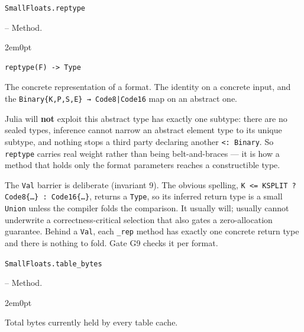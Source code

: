 \par\medskip\noindent\begin{minipage}{\linewidth}
\hypertarget{12298054483771101579}{\texttt{SmallFloats.reptype}}  -- {Method.}
\nopagebreak
\begin{adjustwidth}{2em}{0pt}


\begin{verbatim}
reptype(F) -> Type
\end{verbatim}

The concrete representation of a format. The identity on a concrete input, and the \texttt{Binary\{K,P,S,E\} → Code8|Code16} map on an abstract one.

Julia will \textbf{not} exploit {\textquotedbl}this abstract type has exactly one subtype{\textquotedbl}: there are no sealed types, inference cannot narrow an abstract element type to its unique subtype, and nothing stops a third party declaring another \texttt{<: Binary}. So \texttt{reptype} carries real weight rather than being belt-and-braces — it is how a method that holds only the format parameters reaches a constructible type.

The \texttt{Val} barrier is deliberate (invariant 9). The obvious spelling, \texttt{K <= KSPLIT ? Code8\{…\} : Code16\{…\}}, returns a \texttt{Type}, so its inferred return type is a small \texttt{Union} unless the compiler folds the comparison. It usually will; {\textquotedbl}usually{\textquotedbl} cannot underwrite a correctness-critical selection that also gates a zero-allocation guarantee. Behind a \texttt{Val}, each \texttt{\_\allowbreak{}rep} method has exactly one concrete return type and there is nothing to fold. Gate G9 checks it per format.



\end{adjustwidth}
\end{minipage}
\par\medskip

\par\medskip\noindent\begin{minipage}{\linewidth}
\hypertarget{11502893033482809346}{\texttt{SmallFloats.table\_\allowbreak{}bytes}}  -- {Method.}
\nopagebreak
\begin{adjustwidth}{2em}{0pt}

Total bytes currently held by every table cache.



\end{adjustwidth}
\end{minipage}
\par\medskip

